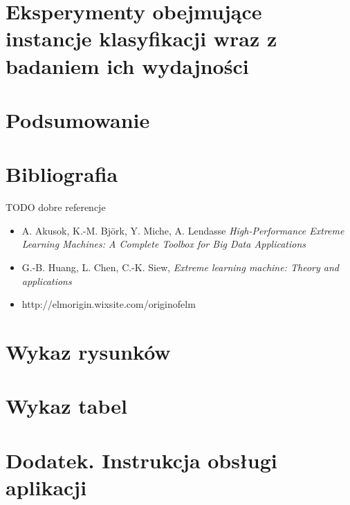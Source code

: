 \documentclass{article}
\begin{document}
\section{Eksperymenty obejmujące instancje klasyfikacji wraz z badaniem ich wydajności}
\clearpage
\section*{Podsumowanie}

\clearpage
\section*{Bibliografia}
TODO dobre referencje
\begin{itemize}
\item A. Akusok, K.-M. Björk, Y. Miche, A. Lendasse \textit{High-Performance Extreme Learning Machines: A Complete Toolbox for Big Data Applications}
\item G.-B. Huang, L. Chen, C.-K. Siew, \textit{Extreme learning machine: Theory and applications} 
\item http://elmorigin.wixsite.com/originofelm
\end{itemize}
\clearpage
\section*{Wykaz rysunków}

\clearpage
\section*{Wykaz tabel}

\clearpage
\section*{Dodatek. Instrukcja obsługi aplikacji}

\clearpage
\end{document}
